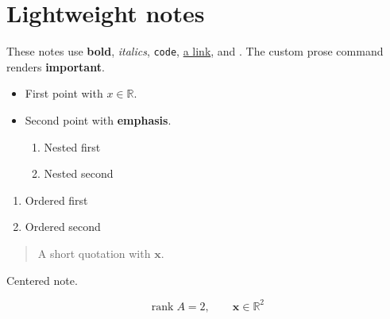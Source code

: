 \usepackage{amsmath,amssymb,hyperref}
\usepackage{not-a-real-package}
\newcommand{\R}{\mathbb{R}}
\newcommand{\vect}[1]{\mathbf{#1}}
\newcommand{\word}[1]{\textbf{#1}}
\DeclareMathOperator{\rank}{rank}

\section{Lightweight notes}
These notes use \textbf{bold}, \textit{italics}, \texttt{code},
\href{https://example.com}{a link}, and .
The custom prose command renders \word{important}.

\begin{itemize}
  \item First point with $x\in\R$.
  \item Second point with \textbf{emphasis}.
  \begin{enumerate}
    \item Nested first
    \item Nested second
  \end{enumerate}
\end{itemize}

\begin{enumerate}
  \item Ordered first
  \item Ordered second
\end{enumerate}

\begin{quote}
A short quotation with $\vect{x}$.
\end{quote}

\begin{center}
Centered note.
\end{center}

\[
  \rank A = 2, \qquad \vect{x}\in\R^2
\]

